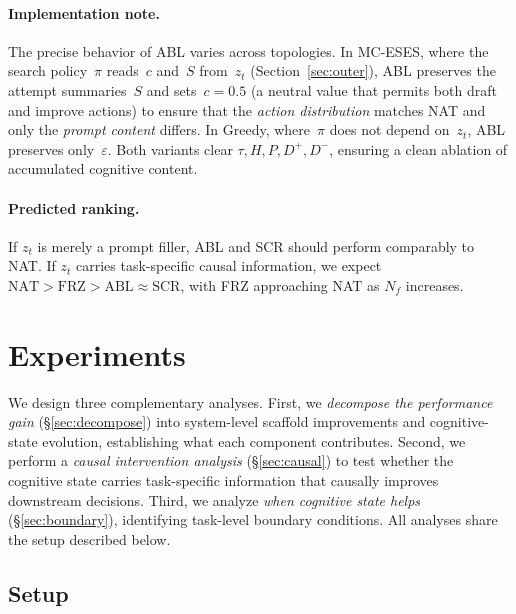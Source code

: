 \documentclass{article} %
\newcommand{\zt}{z_t}
\begin{document}
\paragraph{Implementation note.}
The precise behavior of ABL varies across topologies. In MC-ESES, where the
search policy~$\pi$ reads~$c$ and~$S$ from~$\zt$ (Section~\ref{sec:outer}),
ABL preserves the attempt summaries~$S$ and sets~$c = 0.5$ (a neutral value
that permits both draft and improve actions) to ensure that the
\emph{action distribution} matches NAT and only the \emph{prompt content}
differs. In Greedy, where~$\pi$ does not depend on~$\zt$, ABL preserves
only~$\varepsilon$. Both variants clear $\tau, H, P, D^{+}, D^{-}$,
ensuring a clean ablation of accumulated cognitive content.

\paragraph{Predicted ranking.}
If $\zt$ is merely a prompt filler, ABL and SCR should perform comparably to
NAT. If $\zt$ carries task-specific causal information, we expect
$\text{NAT} > \text{FRZ} > \text{ABL} \approx \text{SCR}$,
with FRZ approaching NAT as $N_f$ increases.


\section{Experiments}
\label{sec:experiments}

We design three complementary analyses. First, we \emph{decompose the
performance gain} (\S\ref{sec:decompose}) into system-level scaffold
improvements and cognitive-state evolution, establishing what each component
contributes. Second, we perform a \emph{causal intervention analysis}
(\S\ref{sec:causal}) to test whether the cognitive state carries task-specific
information that causally improves downstream decisions. Third, we analyze
\emph{when cognitive state helps} (\S\ref{sec:boundary}), identifying
task-level boundary conditions. All analyses share the setup described below.


\subsection{Setup}
\label{sec:setup}
\end{document}
